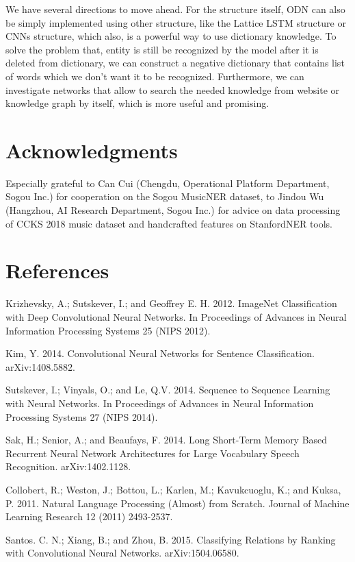 \documentclass[letterpaper]{article} %
\begin{document}
We have several directions to move ahead. For the structure itself, ODN can also be simply implemented using other structure, like the Lattice LSTM structure or CNNs structure, which also, is a powerful way to use dictionary knowledge. To solve the problem that, entity is still be recognized by the model after it is deleted from dictionary, we can construct a negative dictionary that contains list of words which we don't want it to be recognized. Furthermore, we can investigate networks that allow to search the needed knowledge from website or knowledge graph by itself, which is more useful and promising.

\section{ Acknowledgments }
Especially grateful to Can Cui (Chengdu, Operational Platform Department, Sogou Inc.) for cooperation on the Sogou MusicNER dataset, to Jindou Wu (Hangzhou, AI Research Department, Sogou Inc.) for advice on data processing of CCKS 2018 music dataset and handcrafted features on StanfordNER tools.

\section{References}

\smallskip \noindent
Krizhevsky, A.; Sutskever, I.; and Geoffrey E. H. 2012. ImageNet Classification with Deep Convolutional Neural Networks. In Proceedings of  Advances in Neural Information Processing Systems 25 (NIPS 2012).

\smallskip \noindent
Kim, Y. 2014. Convolutional Neural Networks for Sentence Classification. arXiv:1408.5882.

\smallskip \noindent
Sutskever, I.; Vinyals, O.; and Le, Q.V. 2014. Sequence to Sequence Learning with Neural Networks. In Proceedings of Advances in Neural Information Processing Systems 27 (NIPS 2014).

\smallskip \noindent
Sak, H.; Senior, A.; and Beaufays, F. 2014. Long Short-Term Memory Based Recurrent Neural Network Architectures for Large Vocabulary Speech Recognition. arXiv:1402.1128.

\smallskip \noindent 
Collobert, R.; Weston, J.; Bottou, L.; Karlen, M.; Kavukcuoglu, K.; and Kuksa, P. 2011. Natural Language Processing (Almost) from Scratch. Journal of Machine Learning Research 12 (2011) 2493-2537. 

\smallskip \noindent
Santos. C. N.; Xiang, B.; and Zhou, B. 2015. Classifying Relations by Ranking with Convolutional Neural Networks. arXiv:1504.06580. 
\end{document}
